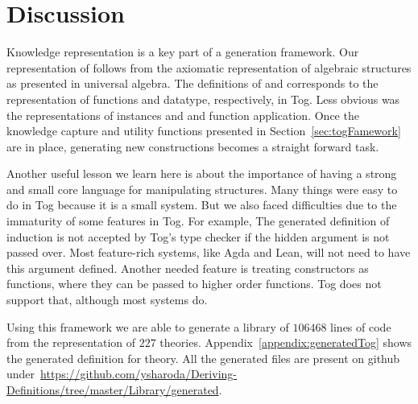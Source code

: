 \section{Discussion}
\label{sec:generation:discussion}
Knowledge representation is a key part of a generation framework. Our representation of  follows from the axiomatic representation of algebraic structures as presented in universal algebra. The definitions of  and  corresponds to the representation of functions and datatype, respectively, in Tog. Less obvious was the representations of instances  and  and function application. 
Once the knowledge capture and utility functions presented in Section~\ref{sec:togFamework} are in place, generating new constructions becomes a straight forward task. 

Another useful lesson we learn here is about the importance of having a strong and small core language for manipulating structures. Many things were easy to do in Tog because it is a small system. But we also faced difficulties due to the immaturity of some features in Tog.  
For example, The generated definition of induction is not accepted by Tog's type checker if the hidden argument  is not passed over. Most feature-rich systems, like Agda and Lean, will not need to have this argument defined. Another needed feature is treating constructors as functions, where they can be passed to higher order functions. Tog does not support that, although most systems do.  

Using this framework we are able to generate a library of $106468$ lines of code from the representation of $227$ theories. Appendix~\ref{appendix:generatedTog} shows the generated definition for  theory. All the generated files are present on github under~\url{https://github.com/ysharoda/Deriving-Definitions/tree/master/Library/generated}. 
 
